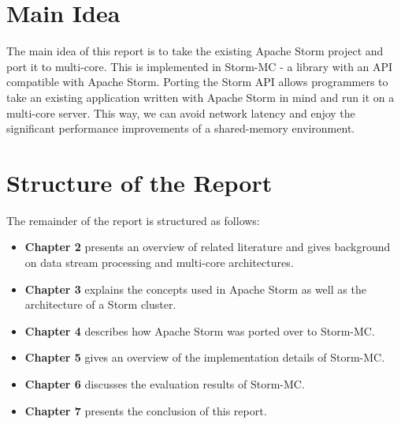 \section{Main Idea}

The main idea of this report is to take the existing Apache Storm project and port it to multi-core. This is implemented in Storm-MC - a library with an API compatible with Apache Storm. Porting the Storm API allows programmers to take an existing application written with Apache Storm in mind and run it on a multi-core server. This way, we can avoid network latency and enjoy the significant performance improvements of a shared-memory environment.

\section{Structure of the Report}

The remainder of the report is structured as follows:

\begin{itemize}
	\item \textbf{Chapter 2} presents an overview of related literature and gives background on data stream processing and multi-core architectures.
	\item \textbf{Chapter 3} explains the concepts used in Apache Storm as well as the architecture of a Storm cluster.
	\item \textbf{Chapter 4} describes how Apache Storm was ported over to Storm-MC.
	\item \textbf{Chapter 5} gives an overview of the implementation details of Storm-MC.
	\item \textbf{Chapter 6} discusses the evaluation results of Storm-MC.
	\item \textbf{Chapter 7} presents the conclusion of this report.
\end{itemize}
